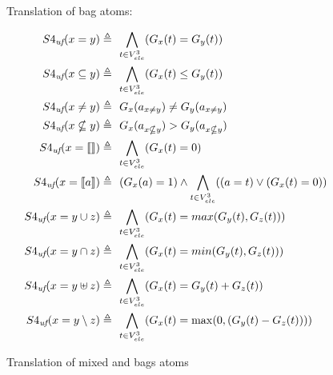 \begin{figure}
\begin{mdframed}
Translation of bag atoms:

\begin{align*}
 S4_{\textit{uf}}(x = y)           \triangleq &\ \   \underset{t \in V^3_{ele}}{\bigwedge}(G_{x}(t) = G_{y}(t))   \\
 S4_{\textit{uf}}(x \subseteq y)   \triangleq &\ \   \underset{t \in V^3_{ele}}{\bigwedge}(G_{x}(t) \le G_{y}(t))   \\
 S4_{\textit{uf}}(x \neq y)        \triangleq &\ \   G_{x}(a_{x \neq y}) \neq G_{y}(a_{x \neq y})   \\
 S4_{\textit{uf}}(x \nsubseteq y)  \triangleq &\ \   G_{x}(a_{x \nsubseteq y}) > G_{y}(a_{x \nsubseteq y})   \\
 S4_{\textit{uf}}(x = \llbracket  \rrbracket )  \triangleq &\ \   \underset{t\in V^3_{ele}}{\bigwedge}(G_{x}(t) = 0)  \\
 S4_{\textit{uf}}(x = \llbracket a \rrbracket)  \triangleq &\ \   (G_{x}(a) = 1)  \land \underset{t\in V^3_{ele}}{\bigwedge}((a = t) \lor (G_{x}(t) = 0))    \\
 S4_{\textit{uf}}(x = y \cup z)    \triangleq &\ \   \underset{t\in V^3_{ele}}{\bigwedge}(G_{x}(t) = max(G_{y}(t),G_{z}(t)))   \\
 S4_{\textit{uf}}(x = y \cap z)    \triangleq &\ \   \underset{t\in V^3_{ele}}{\bigwedge}(G_{x}(t) = min(G_{y}(t),G_{z}(t)))   \\
 S4_{\textit{uf}}(x = y \uplus z)   \triangleq &\ \   \underset{t\in V^3_{ele}}{\bigwedge}(G_{x}(t) = G_{y}(t)+G_{z}(t))   \\
 S4_{\textit{uf}}(x = y \setminus z) \triangleq &\ \   \underset{t\in V^3_{ele}}{\bigwedge}(G_{x}(t) = \max(0,(G_{y}(t)-G_{z}(t))))
\end{align*}
\caption{Translation of mixed and bags atoms}
\label{fig:SU4}
\end{mdframed}
\end{figure}
